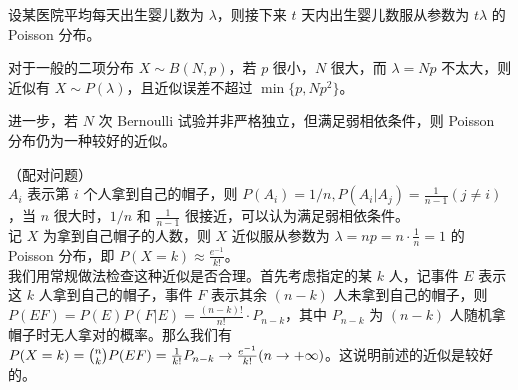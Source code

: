 \documentclass[../main.tex]{subfiles}
\begin{document}
\begin{example}
    设某医院平均每天出生婴儿数为 $\lambda$，则接下来 $t$ 天内出生婴儿数服从参数为 $t\lambda$ 的 Poisson 分布。
\end{example}

对于一般的二项分布 $X\sim B(N,p)$，若 $p$ 很小，$N$ 很大，而 $\lambda=Np$ 不太大，则近似有 $X\sim P(\lambda)$，且近似误差不超过 $\min\{p,Np^2\}$。

进一步，若 $N$ 次 Bernoulli 试验并非严格独立，但满足弱相依条件，则 Poisson 分布仍为一种较好的近似。

\begin{example}
    （配对问题）\\
    $A_i$ 表示第 $i$ 个人拿到自己的帽子，则 $P(A_i)=1/n,P(A_i|A_j)=\frac{1}{n-1}(j\neq i)$，当 $n$ 很大时，$1/n$ 和 $\frac{1}{n-1}$ 很接近，可以认为满足弱相依条件。\\
    记 $X$ 为拿到自己帽子的人数，则 $X$ 近似服从参数为 $\lambda=np=n\cdot\frac{1}{n}=1$ 的 Poisson 分布，即 $P(X=k)\approx\frac{e^{-1}}{k!}$。\\
    我们用常规做法检查这种近似是否合理。首先考虑指定的某 $k$ 人，记事件 $E$ 表示这 $k$ 人拿到自己的帽子，事件 $F$ 表示其余 $(n-k)$ 人未拿到自己的帽子，则 $P(EF)=P(E)P(F|E)=\frac{(n-k)!}{n!}\cdot P_{n-k}$，其中 $P_{n-k}$ 为 $(n-k)$ 人随机拿帽子时无人拿对的概率。那么我们有 $P(X=k)=\tbinom{n}{k}P(EF)=\frac{1}{k!}P_{n-k}\rightarrow\frac{e^{-1}}{k!}(n\rightarrow+\infty)$。这说明前述的近似是较好的。
\end{example}
\end{document}
